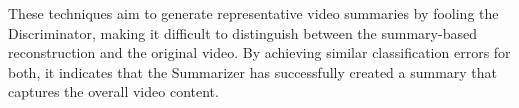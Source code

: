 These techniques aim to generate representative video summaries by fooling the Discriminator, making it difficult to distinguish between the summary-based reconstruction and the original video. By achieving similar classification errors for both, it indicates that the Summarizer has successfully created a summary that captures the overall video content.